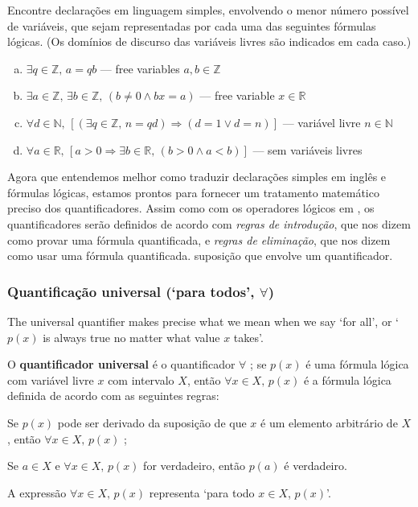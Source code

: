 \begin{exercise}
\label{exLogicalFormulaeToEnglish}
Encontre declarações em linguagem simples, envolvendo o menor número possível de variáveis, que sejam representadas por cada uma das seguintes fórmulas lógicas. (Os domínios de discurso das variáveis ​​livres são indicados em cada caso.)
\begin{enumerate}[(a)]
\item $\exists q \in \mathbb{Z},\, a = qb$ --- free variables $a, b \in \mathbb{Z}$
\item $\exists a \in \mathbb{Z},\, \exists b \in \mathbb{Z},\, (b \ne 0 \wedge bx = a)$ --- free variable $x \in \mathbb{R}$
\item $\forall d \in \mathbb{N},\, [(\exists q \in \mathbb{Z},\, n=qd) \Rightarrow (d = 1 \vee d = n)]$ --- variável livre $n \in \mathbb{N}$
\item $\forall a \in \mathbb{R},\, [a > 0 \Rightarrow \exists b \in \mathbb{R},\, (b > 0 \wedge a < b)]$ --- sem variáveis ​​livres
\end{enumerate}
\end{exercise}

Agora que entendemos melhor como traduzir declarações simples em inglês e fórmulas lógicas, estamos prontos para fornecer um tratamento matemático preciso dos quantificadores. Assim como com os operadores lógicos em , os quantificadores serão definidos de acordo com \textit{regras de introdução}, que nos dizem como provar uma fórmula quantificada, e \textit{regras de eliminação}, que nos dizem como usar uma fórmula quantificada. suposição que envolve um quantificador.

\subsubsection*{Quantificação universal (`para todos', $\forall$)}

The universal quantifier makes precise what we mean when we say `for all', or `$p(x)$ is always true no matter what value $x$ takes'.

\begin{definition}
\label{defUniversalQuantifier}
O \textbf{quantificador universal} é o quantificador $\forall$ ; se $p(x)$ é uma fórmula lógica com variável livre $x$ com intervalo $X$, então $\forall x \in X,\, p(x)$ é a fórmula lógica definida de acordo com as seguintes regras:
\begin{itemizar}
\item \introrule{\forall} Se $p(x)$ pode ser derivado da suposição de que $x$ é um elemento arbitrário de $X$, então $\forall x \in X,\, p(x)$ ;
\item \elimrule{\forall} Se $a \in X$ e $\forall x \in X,\, p(x)$ for verdadeiro, então $p(a)$ é verdadeiro.
\end{itemizar}
A expressão $\forall x \in X,\, p(x)$ representa `para todo $x \in X$, $p(x)$'.
\end{definition}

